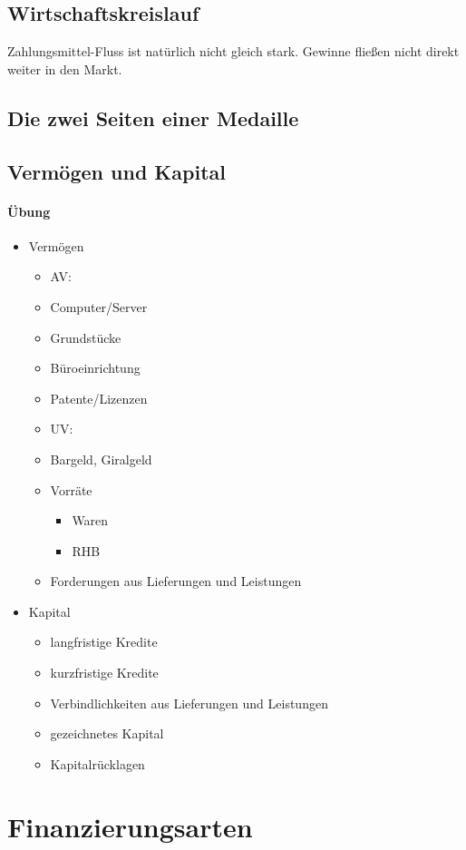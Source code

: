 \subsection{Wirtschaftskreislauf}
Zahlungsmittel-Fluss ist natürlich nicht gleich stark. Gewinne fließen nicht direkt weiter in den Markt. 
\subsection{Die zwei Seiten einer Medaille}
\subsection{Vermögen und Kapital}
\paragraph{Übung}
\begin{itemize}
\item Vermögen
\begin{itemize}
\item[] AV:
\item Computer/Server
\item Grundstücke
\item Büroeinrichtung
\item Patente/Lizenzen
\item[] UV:
\item Bargeld, Giralgeld
\item Vorräte
\begin{itemize}
\item Waren
\item RHB
\end{itemize}
\item Forderungen aus Lieferungen und Leistungen
\end{itemize}
\item Kapital
\begin{itemize}
\item langfristige Kredite
\item kurzfristige Kredite
\item Verbindlichkeiten aus Lieferungen und Leistungen
\item gezeichnetes Kapital
\item Kapitalrücklagen
\end{itemize}
\end{itemize}
\section{Finanzierungsarten}
